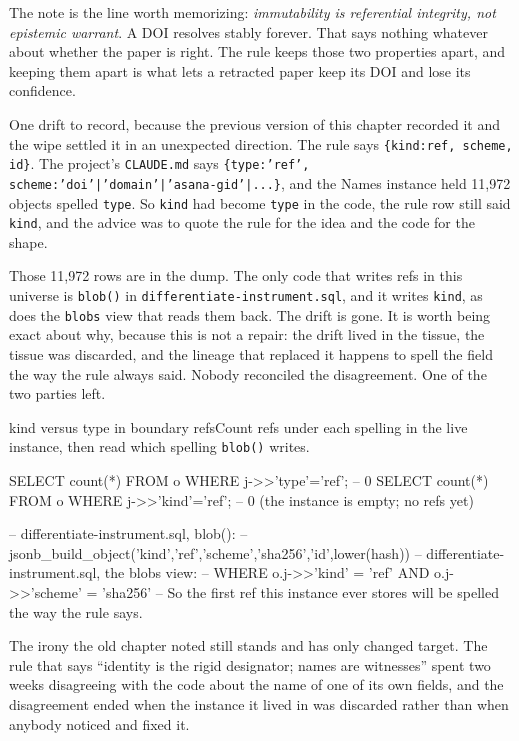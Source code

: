 The note is the line worth memorizing: \emph{immutability is referential integrity, not epistemic warrant}. A DOI resolves stably forever. That says nothing whatever about whether the paper is right. The rule keeps those two properties apart, and keeping them apart is what lets a retracted paper keep its DOI and lose its confidence.

One drift to record, because the previous version of this chapter recorded it and the wipe settled it in an unexpected direction. The rule says \texttt{\{kind:ref, scheme, id\}}. The project's \texttt{CLAUDE.md} says \texttt{\{type:'ref', scheme:'doi'|'domain'|'asana-gid'|...\}}, and the Names instance held 11,972 objects spelled \texttt{type}. So \texttt{kind} had become \texttt{type} in the code, the rule row still said \texttt{kind}, and the advice was to quote the rule for the idea and the code for the shape.

Those 11,972 rows are in the dump. The only code that writes refs in this universe is \texttt{blob()} in \texttt{differentiate-instrument.sql}, and it writes \texttt{kind}, as does the \texttt{blobs} view that reads them back. The drift is gone. It is worth being exact about why, because this is not a repair: the drift lived in the tissue, the tissue was discarded, and the lineage that replaced it happens to spell the field the way the rule always said. Nobody reconciled the disagreement. One of the two parties left.

\begin{Correspondence}{kind versus type in boundary refs}{Count refs under each spelling in the live instance, then read which spelling \texttt{blob()} writes.}
\begin{Check}
SELECT count(*) FROM o WHERE j->>'type'='ref';   -- 0
SELECT count(*) FROM o WHERE j->>'kind'='ref';   -- 0   (the instance is empty; no refs yet)

-- differentiate-instrument.sql, blob():
--   jsonb_build_object('kind','ref','scheme','sha256','id',lower(hash))
-- differentiate-instrument.sql, the blobs view:
--   WHERE o.j->>'kind' = 'ref' AND o.j->>'scheme' = 'sha256'
-- So the first ref this instance ever stores will be spelled the way the rule says.
\end{Check}
The irony the old chapter noted still stands and has only changed target. The rule that says ``identity is the rigid designator; names are witnesses'' spent two weeks disagreeing with the code about the name of one of its own fields, and the disagreement ended when the instance it lived in was discarded rather than when anybody noticed and fixed it.
\end{Correspondence}

